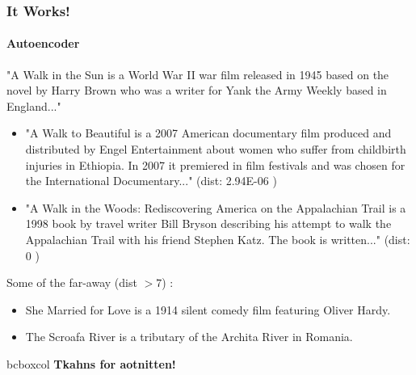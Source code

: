 \documentclass[compress,red]{beamer}
\begin{document}
\begin{frame}\frametitle{It Works!}
\framesubtitle{Autoencoder}

\begin{small}
"A Walk in the Sun is a World War II war film released in 1945 based on the novel by Harry Brown who was a writer for Yank the Army Weekly based in England..."

\begin{itemize}

\item "A Walk to Beautiful is a 2007 American documentary film produced and distributed by Engel Entertainment about women who suffer from childbirth injuries in Ethiopia. In 2007 it premiered in film festivals and was chosen for the International Documentary..." (dist: 2.94E-06 )

\item "A Walk in the Woods: Rediscovering America on the Appalachian Trail is a 1998 book by travel writer Bill Bryson describing his attempt to walk the Appalachian Trail with his friend Stephen Katz. The book is written..." (dist: 0 ) 
\end{itemize}

Some of the far-away (dist $>7$) :
\begin{itemize}
\item She Married for Love is a 1914 silent comedy film featuring Oliver Hardy.
\item The Scroafa River is a tributary of the Archita River in Romania.
\end{itemize}
\end{small}

\end{frame}


\begin{frame}[plain]
\begin{beamercolorbox}[center, sep=2pt, rounded=true, shadow=true]{bcboxcol}
\LARGE\bfseries Tkahns for aotnitten! \\
\end{beamercolorbox}
\end{frame}
\end{document}
